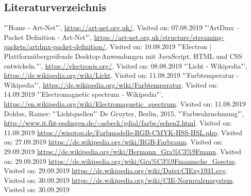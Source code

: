 \documentclass[11pt]{scrartcl}
\begin{document}
\subsection{Literaturverzeichnis}
\begingroup
\renewcommand{\section}[2]{}
\begin{thebibliography}{xxxxxxxxxxxxxxxxxxx}
    "'Home - Art-Net"', \url{https://art-net.org.uk/}. Visited on: 07.08.2019
    "'ArtDmx – Packet Definition - Art-Net"', \url{https://art-net.org.uk/structure/streaming-packets/artdmx-packet-definition/}. Visited on: 10.08.2019
    "'Electron | Plattformübergreifende Desktop-Anwendungen mit JavaScript, HTML und CSS entwickeln."', \url{https://electronjs.org/}. Visited on: 08.08.2019
    "'Licht - Wikipedia"', \url{https://de.wikipedia.org/wiki/Licht}. Visited on: 11.08.2019
    "'Farbtemperatur - Wikipedia"', \url{https://de.wikipedia.org/wiki/Farbtemperatur}. Visited on: 14.09.2019
    "'Electromagnetic spectrum - Wikipedia"', \url{https://en.wikipedia.org/wiki/Electromagnetic_spectrum}. Visited on: 11.08.2019
     Dohlus, Rainer: "'Lichtquellen"' De Gruyter, Berlin, 2015, 
    "'Farbwahrnehmung"', \url{http://www.it.fht-esslingen.de/~asbeck/gdial/farbe/sehen2.html}. Visited on: 11.08.2019
     \url{https://wisotop.de/Farbmodelle-RGB-CMYK-HSS-HSL.php}. Visited on: 27.09.2019
     \url{https://de.wikipedia.org/wiki/RGB-Farbraum}. Visited on: 29.09.2019
     \url{https://de.wikipedia.org/wiki/Hermann\_Gra%C3%9Fmann}. Visited on: 29.09.2019
     \url{https://de.wikipedia.org/wiki/Gra%C3%9Fmannsche_Gesetze}. Visited on: 29.09.2019
     \url{https://de.wikipedia.org/wiki/Datei:CIExy1931.svg}. Visited on: 30.09.2019
     \url{https://de.wikipedia.org/wiki/CIE-Normvalenzsystem}. Visited on: 30.09.2019

\end{thebibliography}
\end{document}
